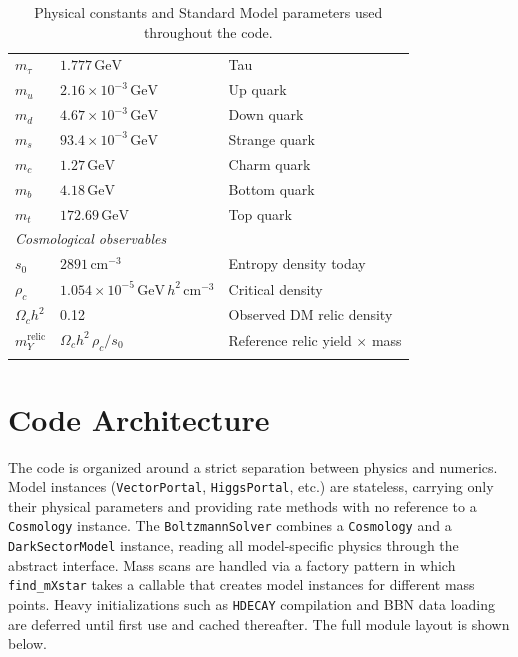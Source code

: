 \documentclass[11pt]{article}
\numberwithin{equation}{section}
\newcommand{\GeV}{\,\text{GeV}}
\newcommand{\cm}{\,\text{cm}}
\newcommand{\Och}{\Omega_c h^2}
\begin{document}
\begin{longtable}{lll}
$m_\tau$ & $1.777\GeV$ & Tau \\
$m_u$ & $2.16\times 10^{-3}\GeV$ & Up quark \\
$m_d$ & $4.67\times 10^{-3}\GeV$ & Down quark \\
$m_s$ & $93.4\times 10^{-3}\GeV$ & Strange quark \\
$m_c$ & $1.27\GeV$ & Charm quark \\
$m_b$ & $4.18\GeV$ & Bottom quark \\
$m_t$ & $172.69\GeV$ & Top quark \\
\midrule
\multicolumn{3}{l}{\textit{Cosmological observables}} \\
$s_0$ & $2891\cm^{-3}$ & Entropy density today \\
$\rho_c$ & $1.054\times 10^{-5}\GeV\,h^2\cm^{-3}$ & Critical density \\
$\Och$ & 0.12 & Observed DM relic density \\
$m_Y^{\text{relic}}$ & $\Och\,\rho_c/s_0$ & Reference relic yield $\times$ mass \\
\bottomrule
\caption{Physical constants and Standard Model parameters used throughout the code.}
\label{tab:constants}
\end{longtable}


\section{Code Architecture}
\label{sec:architecture}
The code is organized around a strict separation between physics and numerics. Model instances (\texttt{VectorPortal}, \texttt{HiggsPortal}, etc.) are stateless, carrying only their physical parameters and providing rate methods with no reference to a \texttt{Cosmology} instance. The \texttt{BoltzmannSolver} combines a \texttt{Cosmology} and a \texttt{DarkSectorModel} instance, reading all model-specific physics through the abstract interface. Mass scans are handled via a factory pattern in which \texttt{find\_mXstar} takes a callable that creates model instances for different mass points. Heavy initializations such as \texttt{HDECAY} compilation and BBN data loading are deferred until first use and cached thereafter. The full module layout is shown below.
\end{document}
